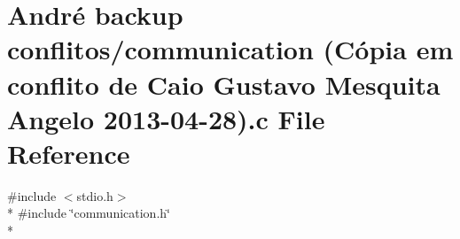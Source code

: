 \hypertarget{communication_01_07C_xC3_xB3pia_01em_01conflito_01de_01Caio_01Gustavo_01Mesquita_01Angelo_012013-04-28_08_8c}{\section{André backup conflitos/communication (Cópia em conflito de Caio Gustavo Mesquita Angelo 2013-\/04-\/28).c File Reference}
\label{communication_01_07C_xC3_xB3pia_01em_01conflito_01de_01Caio_01Gustavo_01Mesquita_01Angelo_012013-04-28_08_8c}
}
{\ttfamily \#include $<$stdio.\-h$>$}\\*
{\ttfamily \#include \char`\"{}communication.\-h\char`\"{}}\\*
